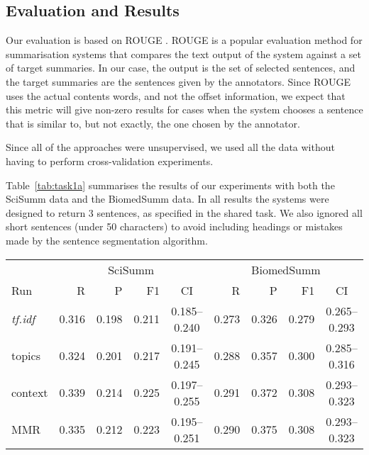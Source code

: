 \documentclass[11pt]{article}
\begin{document}
\subsection{Evaluation and Results}

Our evaluation is based on ROUGE \cite{Lin:2004}. ROUGE is a popular
evaluation method for summarisation systems that compares the text
output of the system against a set of target summaries. In our case,
the output is the set of selected sentences, and the target summaries
are the sentences given by the annotators. Since ROUGE uses the actual
contents words, and not the offset information, we expect that this
metric will give non-zero results for cases when the system chooses a
sentence that is similar to, but not exactly, the one chosen by the
annotator.

Since all of the approaches were unsupervised, we used all the data
without having to perform cross-validation experiments.

Table~\ref{tab:task1a} summarises the results of our experiments with
both the SciSumm data and the BiomedSumm data. In all results the
systems were designed to return 3 sentences, as specified in the
shared task. We also ignored all short sentences (under 50 characters)
to avoid including headings or mistakes made by the sentence
segmentation algorithm.

\begin{table*}
  \centering
  \begin{tabular}{l|rrrc|rrrc}
& \multicolumn{4}{|c|}{SciSumm} & \multicolumn{4}{c}{BiomedSumm}\\
Run & R & P & F1 & CI & R & P & F1 & CI\\
\hline
    \emph{tf.idf} & 0.316 & 0.198 & 0.211 & 0.185--0.240 & 0.273 &
    0.326 & 0.279 & 0.265--0.293\\
topics & 0.324 & 0.201 & 0.217 & 0.191--0.245 & 0.288 & 0.357 & 0.300
& 0.285--0.316\\
context & 0.339 & 0.214 & 0.225 & 0.197--0.255 & 0.291 & 0.372 & 0.308
& 0.293--0.323\\
MMR & 0.335 & 0.212 & 0.223 & 0.195--0.251 &  0.290 & 0.375 & 0.308 & 0.293--0.323\\ 
  \end{tabular}
  \caption{ROUGE-L results of our runs for task 1a}
  \label{tab:task1a}
\end{table*}
\end{document}
